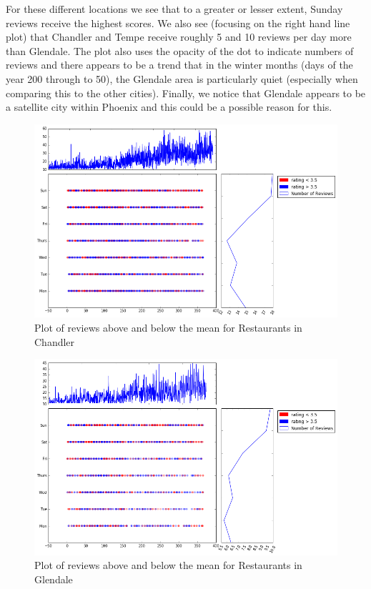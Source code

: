 \documentclass[11pt]{article}
\begin{document}
For these different locations we see that to a greater or lesser extent, Sunday reviews receive the highest scores. We also see (focusing on the right hand line plot) that Chandler and Tempe receive roughly 5 and 10 reviews per day more than Glendale. The plot also uses the opacity of the dot to indicate numbers of reviews and there appears to be a trend that in the winter months (days of the year 200 through to 50), the Glendale area is particularly quiet (especially when comparing this to the other cities). Finally, we notice that Glendale appears to be a satellite city within Phoenix and this could be a possible reason for this.
\begin{figure}[H]
\centering
\includegraphics[keepaspectratio=true,scale=0.4]{./images/chandler_restaurants}
\caption{Plot of reviews above and below the mean for Restaurants in Chandler}\label{fg:chandler}
\end{figure}

\begin{figure}[H]
\centering
\includegraphics[keepaspectratio=true,scale=0.4]{./images/glendale_restaurants}
\caption{Plot of reviews above and below the mean for Restaurants in Glendale}\label{fg:glendale}
\end{figure}
\end{document}
